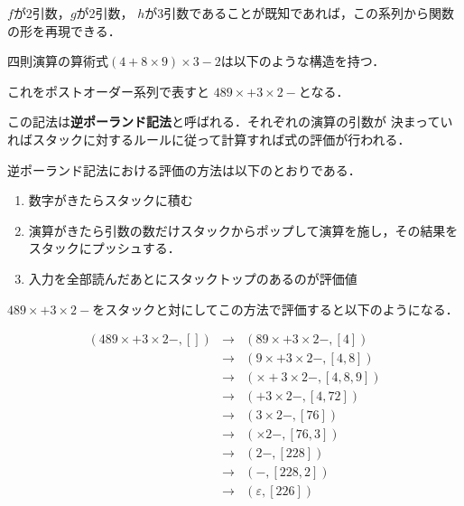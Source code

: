 \documentclass[dvipdfmx,a4j]{jbook}
\begin{document}
$f$が2引数，$g$が2引数，
$h$が3引数であることが既知であれば，この系列から関数の形を再現できる．

四則演算の算術式$(4+8\times 9)\times 3-2$は以下のような構造を持つ．

  これをポストオーダー系列で表すと
  $489\times +3\times 2-$となる．

  この記法は{\bf 逆ポーランド記法}と呼ばれる．それぞれの演算の引数が
  決まっていればスタックに対するルールに従って計算すれば式の評価が行われる．

  逆ポーランド記法における評価の方法は以下のとおりである．
  \begin{enumerate}
    \item 数字がきたらスタックに積む
    \item 演算がきたら引数の数だけスタックからポップして演算を施し，その結果をスタックにプッシュする．
    \item 入力を全部読んだあとにスタックトップのあるのが評価値
  \end{enumerate}

  $489\times +3\times 2-$をスタックと対にしてこの方法で評価すると以下のようになる．

  \[\begin{array}{rcl}
    (489\times +3\times 2-,[]) & \rightarrow &(89\times +3\times 2-,[4])\\
    & \rightarrow & (9\times +3\times 2-,[4,8])\\
    & \rightarrow & (\times +3\times 2-,[4,8,9])\\
    & \rightarrow & (+3\times 2-,[4,72])\\
    & \rightarrow & (3\times 2-,[76])\\
    & \rightarrow & (\times 2-,[76,3])\\
    & \rightarrow & (2-,[228])\\
    & \rightarrow & (-,[228,2])\\
    & \rightarrow & (\varepsilon,[226])
  \end{array}\]
\end{document}
